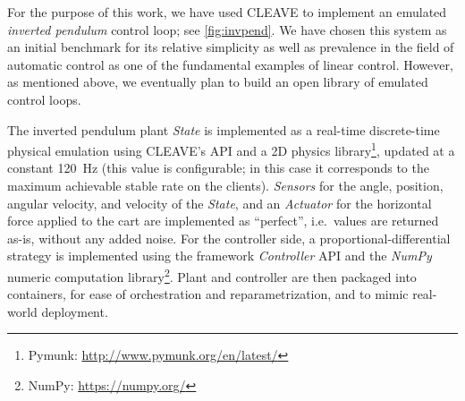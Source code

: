 For the purpose of this work, we have used \ac{CLEAVE} to implement an emulated \emph{inverted pendulum} control loop; see \cref{fig:invpend}.
We have chosen this system as an initial benchmark for its relative simplicity as well as prevalence in the field of automatic control as one of the fundamental examples of linear control.
However, as mentioned above, we eventually plan to build an open library of emulated control loops.  

The inverted pendulum plant \emph{State} is implemented as a real-time discrete-time physical emulation using CLEAVE's API and a 2D physics library\footnote{Pymunk: \url{http://www.pymunk.org/en/latest/}}, updated at a constant \SI{120}{\hertz} (this value is configurable; in this case it corresponds to the maximum achievable stable rate on the clients).
\emph{Sensors} for the angle, position, angular velocity, and velocity of the \emph{State}, and an \emph{Actuator} for the horizontal force applied to the cart are implemented as ``perfect'', i.e.\ values are returned as-is, without any added noise.
For the controller side, a proportional-differential strategy is implemented using the framework \emph{Controller} API and the \emph{NumPy} numeric computation library\footnote{NumPy: \url{https://numpy.org/}}.
Plant and controller are then packaged into containers, for ease of orchestration and reparametrization, and to mimic real-world deployment.
